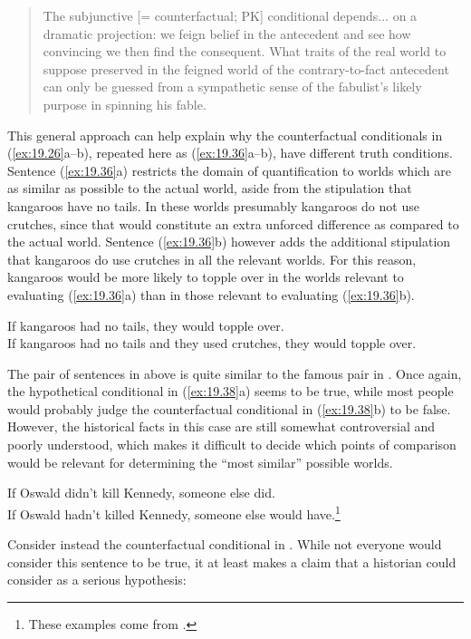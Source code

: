 \begin{quote}
The subjunctive [= counterfactual; PK] conditional depends... on a dramatic projection: we feign belief in the antecedent and see how convincing we then find the consequent. What traits of the real world to suppose preserved in the feigned world of the contrary-to-fact antecedent can only be guessed from a sympathetic sense of the fabulist’s likely purpose in spinning his fable.
\end{quote}


This general approach can help explain why the counterfactual conditionals in (\ref{ex:19.26}a--b), repeated here as (\ref{ex:19.36}a--b), have different truth conditions. Sentence (\ref{ex:19.36}a) restricts the domain of quantification to worlds which are as similar as possible to the actual world, aside from the stipulation that kangaroos have no tails. In these worlds presumably kangaroos do not use crutches, since that would constitute an extra unforced difference as compared to the actual world. Sentence (\ref{ex:19.36}b) however adds the additional stipulation that kangaroos do use crutches in all the relevant worlds. For this reason, kangaroos would be more likely to topple over in the worlds relevant to evaluating (\ref{ex:19.36}a) than in those relevant to evaluating (\ref{ex:19.36}b).


\ea \label{ex:19.36}
\ea  If kangaroos had no tails, they would topple over.\\
\ex If kangaroos had no tails and they used crutches, they would topple over.
                       \z
\z



The pair of sentences in  above is quite similar to the famous pair in . Once again, the hypothetical conditional in (\ref{ex:19.38}a) seems to be true, while most people would probably judge the counterfactual conditional in (\ref{ex:19.38}b) to be false. However, the historical facts in this case are still somewhat controversial and poorly understood, which makes it difficult to decide which points of comparison would be relevant for determining the “most similar” possible worlds.


\ea \label{ex:19.38}
\ea  If Oswald didn’t kill Kennedy, someone else did. \\
\ex If Oswald hadn’t killed Kennedy, someone else would have.\footnote{These examples come from \citet{Adams1970}.}
                       \z
\z


Consider instead the counterfactual conditional in . While not everyone would consider this sentence to be true, it at least makes a claim that a historian could consider as a serious hypothesis:


